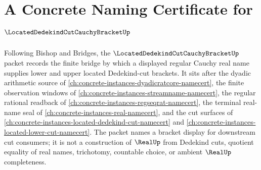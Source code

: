 \chapter{A Concrete Naming Certificate for $\LocatedDedekindCutCauchyBracketUp$}
\label{ch:concrete-instances-located-dedekind-cut-cauchy-bracket-namecert}

Following Bishop and Bridges, the $\LocatedDedekindCutCauchyBracketUp$ packet records the finite bridge by which a displayed regular Cauchy real name supplies lower and upper located Dedekind-cut brackets. It sits after the dyadic arithmetic source of \autoref{ch:concrete-instances-dyadicratcore-namecert}, the finite observation windows of \autoref{ch:concrete-instances-streamname-namecert}, the regular rational readback of \autoref{ch:concrete-instances-regseqrat-namecert}, the terminal real-name seal of \autoref{ch:concrete-instances-real-namecert}, and the cut surfaces of \autoref{ch:concrete-instances-located-dedekind-cut-namecert} and \autoref{ch:concrete-instances-located-lower-cut-namecert}. The packet names a bracket display for downstream cut consumers; it is not a construction of $\RealUp$ from Dedekind cuts, quotient equality of real names, trichotomy, countable choice, or ambient $\RealUp$ completeness.

